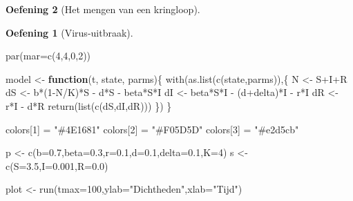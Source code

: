 \documentclass[
  a4paper,
]{scrbook}
\newenvironment{Shaded}{\begin{snugshade}}{\end{snugshade}}
\newcommand{\AttributeTok}[1]{\textcolor[rgb]{0.40,0.45,0.13}{#1}}
\newcommand{\ControlFlowTok}[1]{\textcolor[rgb]{0.00,0.23,0.31}{\textbf{#1}}}
\newcommand{\DecValTok}[1]{\textcolor[rgb]{0.68,0.00,0.00}{#1}}
\newcommand{\FloatTok}[1]{\textcolor[rgb]{0.68,0.00,0.00}{#1}}
\newcommand{\FunctionTok}[1]{\textcolor[rgb]{0.28,0.35,0.67}{#1}}
\newcommand{\NormalTok}[1]{\textcolor[rgb]{0.00,0.23,0.31}{#1}}
\newcommand{\OtherTok}[1]{\textcolor[rgb]{0.00,0.23,0.31}{#1}}
\newcommand{\SpecialCharTok}[1]{\textcolor[rgb]{0.37,0.37,0.37}{#1}}
\newcommand{\StringTok}[1]{\textcolor[rgb]{0.13,0.47,0.30}{#1}}
\theoremstyle{definition}
\newtheorem{exercise}{Oefening}[chapter]
\theoremstyle{remark}
\begin{document}
\begin{exercise}[Het mengen van een
kringloop]
\begin{exercise}[Virus-uitbraak]
\begin{Shaded}
\begin{Highlighting}[]
\FunctionTok{par}\NormalTok{(}\AttributeTok{mar=}\FunctionTok{c}\NormalTok{(}\DecValTok{4}\NormalTok{,}\DecValTok{4}\NormalTok{,}\DecValTok{0}\NormalTok{,}\DecValTok{2}\NormalTok{))}

\NormalTok{model }\OtherTok{\textless{}{-}} \ControlFlowTok{function}\NormalTok{(t, state, parms)\{}
  \FunctionTok{with}\NormalTok{(}\FunctionTok{as.list}\NormalTok{(}\FunctionTok{c}\NormalTok{(state,parms)),\{}
\NormalTok{    N }\OtherTok{\textless{}{-}}\NormalTok{ S}\SpecialCharTok{+}\NormalTok{I}\SpecialCharTok{+}\NormalTok{R}
\NormalTok{    dS }\OtherTok{\textless{}{-}}\NormalTok{ b}\SpecialCharTok{*}\NormalTok{(}\DecValTok{1}\SpecialCharTok{{-}}\NormalTok{N}\SpecialCharTok{/}\NormalTok{K)}\SpecialCharTok{*}\NormalTok{S }\SpecialCharTok{{-}}\NormalTok{ d}\SpecialCharTok{*}\NormalTok{S }\SpecialCharTok{{-}}\NormalTok{ beta}\SpecialCharTok{*}\NormalTok{S}\SpecialCharTok{*}\NormalTok{I}
\NormalTok{    dI }\OtherTok{\textless{}{-}}\NormalTok{ beta}\SpecialCharTok{*}\NormalTok{S}\SpecialCharTok{*}\NormalTok{I }\SpecialCharTok{{-}}\NormalTok{ (d}\SpecialCharTok{+}\NormalTok{delta)}\SpecialCharTok{*}\NormalTok{I }\SpecialCharTok{{-}}\NormalTok{ r}\SpecialCharTok{*}\NormalTok{I}
\NormalTok{    dR }\OtherTok{\textless{}{-}}\NormalTok{ r}\SpecialCharTok{*}\NormalTok{I }\SpecialCharTok{{-}}\NormalTok{ d}\SpecialCharTok{*}\NormalTok{R}
    \FunctionTok{return}\NormalTok{(}\FunctionTok{list}\NormalTok{(}\FunctionTok{c}\NormalTok{(dS,dI,dR)))}
\NormalTok{  \})}
\NormalTok{\}}

\NormalTok{colors[}\DecValTok{1}\NormalTok{] }\OtherTok{=} \StringTok{"\#4E1681"}
\NormalTok{colors[}\DecValTok{2}\NormalTok{] }\OtherTok{=} \StringTok{"\#F05D5D"}
\NormalTok{colors[}\DecValTok{3}\NormalTok{] }\OtherTok{=} \StringTok{"\#e2d5cb"}

\NormalTok{p }\OtherTok{\textless{}{-}} \FunctionTok{c}\NormalTok{(}\AttributeTok{b=}\FloatTok{0.7}\NormalTok{,}\AttributeTok{beta=}\FloatTok{0.3}\NormalTok{,}\AttributeTok{r=}\FloatTok{0.1}\NormalTok{,}\AttributeTok{d=}\FloatTok{0.1}\NormalTok{,}\AttributeTok{delta=}\FloatTok{0.1}\NormalTok{,}\AttributeTok{K=}\DecValTok{4}\NormalTok{)}
\NormalTok{s }\OtherTok{\textless{}{-}} \FunctionTok{c}\NormalTok{(}\AttributeTok{S=}\FloatTok{3.5}\NormalTok{,}\AttributeTok{I=}\FloatTok{0.001}\NormalTok{,}\AttributeTok{R=}\FloatTok{0.0}\NormalTok{)}

\NormalTok{plot }\OtherTok{\textless{}{-}} \FunctionTok{run}\NormalTok{(}\AttributeTok{tmax=}\DecValTok{100}\NormalTok{,}\AttributeTok{ylab=}\StringTok{"Dichtheden"}\NormalTok{,}\AttributeTok{xlab=}\StringTok{"Tijd"}\NormalTok{)}
\end{Highlighting}
\end{Shaded}


\end{exercise}
\end{exercise}
\end{document}
